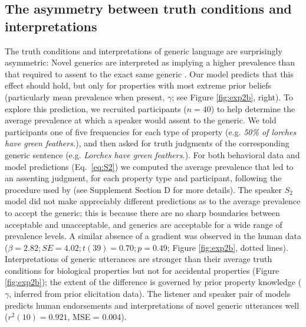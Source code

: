 \documentclass{pnastwo}
\begin{document}
\begin{article}
\subsection{The asymmetry between truth conditions and interpretations}
The truth conditions and interpretations of generic language are surprisingly asymmetric: Novel generics are interpreted as implying a higher prevalence than that required to assent to the exact same generic \cite{Cimpian2010}.
Our model predicts that this effect should hold, but only for properties with most extreme prior beliefs (particularly mean prevalence when present, $\gamma$; see Figure \ref{fig:exp2b}, right).
To explore this prediction, we recruited participants ($n=40$) to help determine the average prevalence at which a speaker would assent to the generic. 
We told participants one of five frequencies for each type of property (e.g. \emph{50\% of lorches have green feathers.}), and then asked for truth judgments of the corresponding generic sentence (e.g. \emph{Lorches have green feathers.}). 
For both behavioral data and model predictions (Eq.~\ref{eq:S2})  we computed the average prevalence that led to an assenting judgment, for each property type and participant, following the procedure used by \cite{Cimpian2010} (see Supplement Section D for more details).
%
%
The speaker $S_2$ model did not make appreciably different predictions as to the average prevalence to accept the generic; this is because there are no sharp boundaries between acceptable and unacceptable, and generics are acceptable for a wide range of prevalence levels. 
A similar absence of a gradient was observed in the human data ($\beta = 2.82; SE = 4.02; t(39) = 0.70; p = 0.49$; Figure \ref{fig:exp2b}, dotted lines). 
Interpretations of generic utterances are stronger than their average truth conditions for biological properties but not for accidental properties (Figure \ref{fig:exp2b}); the extent of the difference is governed by prior property knowledge ($\gamma$, inferred from prior elicitation data).
The listener and speaker pair of models predicts human endorsements and interpretations of novel generic utterances well ($r^2(10) = 0.921$, MSE = 0.004). 


\end{article}
\end{document}
